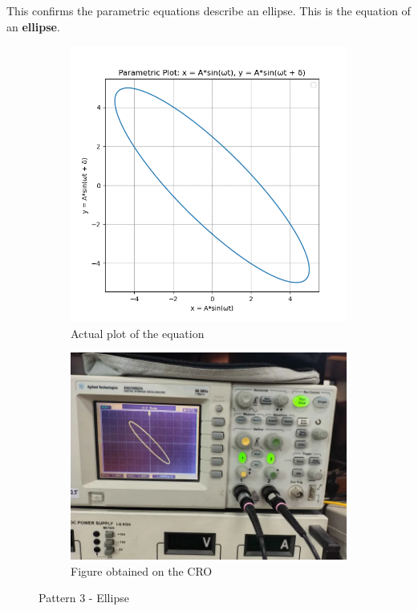 \documentclass[12pt]{article}
\begin{document}
This confirms the parametric equations describe an ellipse.
This is the equation of an \textbf{ellipse}.

\begin{figure}[htbp]
    \centering
    \begin{subfigure}[b]{0.45\textwidth}
        \centering
        \includegraphics[width=\textwidth]{figs/Experiment-1/Observation-3/Figure_1.jpg}
        \caption{Actual plot of the equation}
    \end{subfigure}
    \hfill
    \begin{subfigure}[b]{0.45\textwidth}
        \centering
        \includegraphics[width=\textwidth]{figs/Experiment-1/Observation-3/Figure_2.png}
        \caption{Figure obtained on the CRO}
    \end{subfigure}
    \caption{Pattern 3 - Ellipse}
\end{figure}
\end{document}
